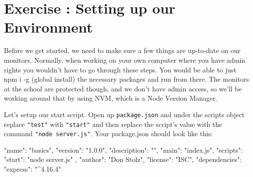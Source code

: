 \documentclass{42-en}
\begin{document}
\chapter{Exercise \exercicenumber: Setting up our Environment}

Before we get started, we need to make sure a few things are up-to-date on our monitors. Normally, when working on your own computer where you have admin rights you wouldn't have to go through these steps. You would be able to just npm i -g (global install) the necessary packages and run from there. The monitors at the school are protected though, and we don't have admin access, so we'll be working around that by using NVM, which is a Node Version Manager.





\newpage
	Let's setup our start script. Open up \texttt{package.json} and under the scripts object replace \texttt{"test"} with \texttt{"start"} and then replace the script's value with the command \texttt{"node server.js"}. Your package.json should look like this:

\begin{42jscode}
{
    "name": "basics",
    "version": "1.0.0",
    "description": "",
    "main": "index.js",
    "scripts": {
        "start": "node server.js"
    },
    "author": "Don Stolz",
    "license": "ISC",
    "dependencies": {
        "express": "^4.16.4"
    }
}
\end{42jscode}
\end{document}
